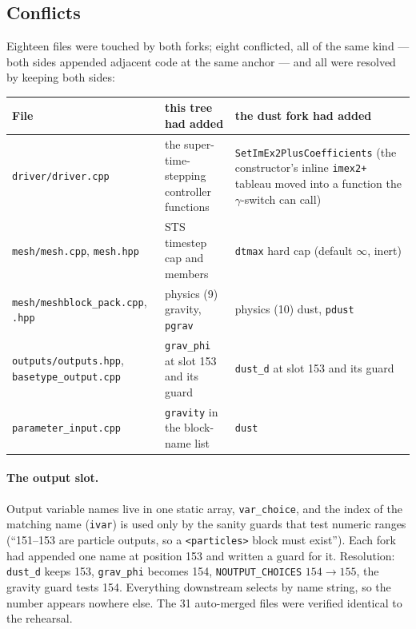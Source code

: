 \documentclass[11pt]{article}
\newcommand{\code}[1]{\texttt{#1}}
\newcommand{\file}[1]{\texttt{\small #1}}
\newcommand{\fn}[1]{\texttt{\small #1}}
\begin{document}
\subsection{Conflicts}

Eighteen files were touched by both forks; eight conflicted, all of the same kind
--- both sides appended adjacent code at the same anchor --- and all were resolved by
keeping both sides:

\begin{center}
\small
\begin{tabular}{@{}>{\raggedright\arraybackslash}p{4.6cm}>{\raggedright\arraybackslash}p{5.4cm}>{\raggedright\arraybackslash}p{5.8cm}@{}}
\toprule
File & this tree had added & the dust fork had added \\
\midrule
\file{driver/driver.cpp} & the super-time-stepping controller functions &
  \fn{SetImEx2PlusCoefficients} (the constructor's inline \code{imex2+} tableau moved
  into a function the $\gamma$-switch can call) \\
\file{mesh/mesh.cpp}, \file{mesh.hpp} & STS timestep cap and members & \code{dtmax}
  hard cap (default $\infty$, inert) \\
\file{mesh/meshblock\_pack.cpp}, \file{.hpp} & physics (9) gravity, \code{pgrav} &
  physics (10) dust, \code{pdust} \\
\file{outputs/outputs.hpp}, \file{basetype\_output.cpp} & \code{grav\_phi} at slot 153
  and its guard & \code{dust\_d} at slot 153 and its guard \\
\file{parameter\_input.cpp} & \code{gravity} in the block-name list & \code{dust} \\
\bottomrule
\end{tabular}
\end{center}

\paragraph{The output slot.} Output variable names live in one static array,
\code{var\_choice}, and the index of the matching name (\code{ivar}) is used only by
the sanity guards that test numeric ranges (``151--153 are particle outputs, so a
\code{<particles>} block must exist''). Each fork had appended one name at position
153 and written a guard for it. Resolution: \code{dust\_d} keeps 153,
\code{grav\_phi} becomes 154, \code{NOUTPUT\_CHOICES} $154 \to 155$, the gravity
guard tests 154. Everything downstream selects by name string, so the number appears
nowhere else. The 31 auto-merged files were verified identical to the rehearsal.
\end{document}
